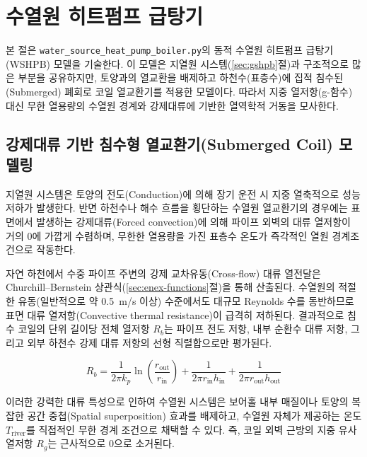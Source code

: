 \section{수열원 히트펌프 급탕기}
\label{sec:wshpb}

본 절은 \texttt{water\_source\_heat\_pump\_boiler.py}의 동적 수열원 히트펌프 급탕기(WSHPB) 모델을 기술한다. 이 모델은 지열원 시스템(\ref{sec:gshpb}절)과 구조적으로 많은 부분을 공유하지만, 토양과의 열교환을 배제하고 하천수(표층수)에 집적 침수된(Submerged) 폐회로 코일 열교환기를 적용한 모델이다. 따라서 지중 열저항(g-함수) 대신 무한 열용량의 수열원 경계와 강제대류에 기반한 열역학적 거동을 모사한다.

\subsection{강제대류 기반 침수형 열교환기(Submerged Coil) 모델링}

지열원 시스템은 토양의 전도(Conduction)에 의해 장기 운전 시 지중 열축적으로 성능 저하가 발생한다. 반면 하천수나 해수 흐름을 횡단하는 수열원 열교환기의 경우에는 표면에서 발생하는 강제대류(Forced convection)에 의해 파이프 외벽의 대류 열저항이 거의 $0$에 가깝게 수렴하며, 무한한 열용량을 가진 표층수 온도가 즉각적인 열원 경계조건으로 작동한다. 

자연 하천에서 수중 파이프 주변의 강제 교차유동(Cross-flow) 대류 열전달은 Churchill--Bernstein 상관식(\ref{sec:enex-functions}절)을 통해 산출된다. 수열원의 적절한 유동(일반적으로 약 0.5~m/s 이상) 수준에서도 대규모 Reynolds 수를 동반하므로 표면 대류 열저항(Convective thermal resistance)이 급격히 저하된다. 결과적으로 침수 코일의 단위 길이당 전체 열저항 $R_b$는 파이프 전도 저항, 내부 순환수 대류 저항, 그리고 외부 하천수 강제 대류 저항의 선형 직렬합으로만 평가된다.

\begin{equation}\label{eq:wshpb-Rb}
  R_b = \frac{1}{2\pi k_p} \ln\!\left(\frac{r_\text{out}}{r_\text{in}}\right) + \frac{1}{2\pi r_\text{in} h_\text{in}} + \frac{1}{2\pi r_\text{out} h_\text{out}}
\end{equation}

이러한 강력한 대류 특성으로 인하여 수열원 시스템은 보어홀 내부 매질이나 토양의 복잡한 공간 중첩(Spatial superposition) 효과를 배제하고, 수열원 자체가 제공하는 온도 $T_{\text{river}}$를 직접적인 무한 경계 조건으로 채택할 수 있다. 즉, 코일 외벽 근방의 지중 유사 열저항 $R_g$는 근사적으로 $0$으로 소거된다.

